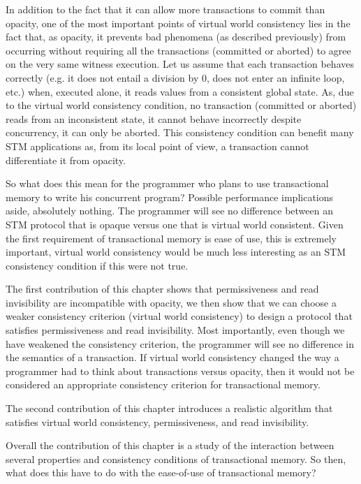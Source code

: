 In addition to the fact that  it can allow more transactions to commit than
opacity,  one of  the most important points  of virtual world  consistency lies 
in   the fact that,  as opacity, it  prevents  bad  phenomena  (as described 
previously)    from occurring  without requiring  all the
transactions  (committed   or  aborted)  to  agree on the very same  witness
execution.  Let  us  assume  that each  transaction  behaves  correctly
(e.g. it does not entail a division  by 0, does not enter an infinite loop,
etc.) when, executed  alone, it  reads  values from  a consistent  global
state.  As, due  to the virtual world consistency  condition, no transaction
(committed or aborted)  reads from an inconsistent state,  it cannot behave
incorrectly despite  concurrency, it can only  be aborted.
This  consistency 
condition  can benefit many  STM applications as, from  its  local point
of view,  a transaction cannot  differentiate it from opacity.

So what does this mean for the programmer who plans to use transactional memory
to write his concurrent program?
Possible performance implications aside, absolutely nothing.
The programmer will see no difference between an STM protocol that is opaque
versus one that is virtual world consistent.
Given the first requirement of transactional memory is ease of use, this is extremely
important, virtual world consistency would be much less interesting as an STM
consistency condition if this were not true.


The first contribution of this chapter shows that permissiveness and read invisibility are
incompatible with opacity, we then show that we can choose a weaker consistency criterion
(virtual world consistency) to design a protocol that satisfies permissiveness and
read invisibility.
Most importantly, even though we have weakened the consistency criterion, the programmer
will see no difference in the semantics of a transaction.
If virtual world consistency changed the way a programmer had to think about transactions versus opacity,
then it would not be considered an appropriate consistency criterion for transactional memory.

The second contribution of this chapter introduces a realistic algorithm that satisfies
virtual world consistency, permissiveness, and read invisibility.


Overall the contribution of this chapter is a study of the interaction
between several properties and consistency conditions of transactional memory.
So then, what does this have to do with the ease-of-use of 
transactional memory?

